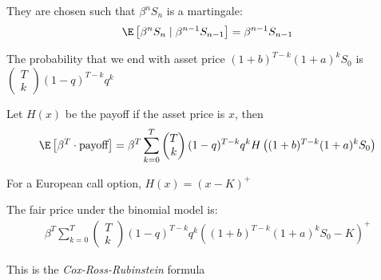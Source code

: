 \noindent They are chosen such that $\beta^nS_n$ is a martingale:
\begin{equation*}
  \begin{gathered}
    \E\left[\beta^nS_n\mid\beta^{n-1}S_{n-1}\right] = \beta^{n-1}S_{n-1}
  \end{gathered}
\end{equation*}
\par\bigskip
\noindent The probability that we end with asset price $(1+b)^{T-k}(1+a)^kS_0$ is $\begin{pmatrix}T\\k\end{pmatrix}(1-q)^{T-k}q^k$\par
\noindent Let $H(x)$ be the payoff if the asset price is $x$, then
\begin{equation*}
  \begin{gathered}
    \E\left[\beta^T\cdot\text{payoff}\right] = \beta^T\sum_{k=0}^{T}\begin{pmatrix}T\\k\end{pmatrix}(1-q)^{T-k}q^kH\left((1+b)^{T-k}(1+a)^kS_0\right)
  \end{gathered}
\end{equation*}\par
\noindent For a European call option, $H(x) = (x-K)^+$\par
\noindent The fair price under the binomial model is:
\begin{equation*}
  \begin{gathered}
    \beta^T\sum_{k=0}^{T}\begin{pmatrix}T\\k\end{pmatrix}(1-q)^{T-k}q^k\left((1+b)^{T-k}(1+a)^kS_0-K\right)^+
  \end{gathered}
\end{equation*}\par
\noindent This is the \textit{Cox-Ross-Rubinstein} formula
\par\bigskip
